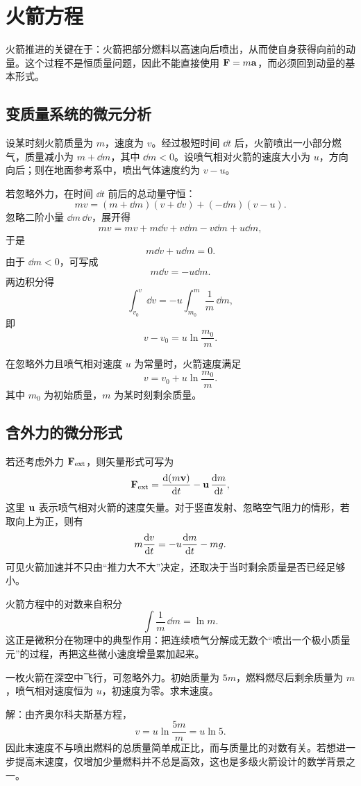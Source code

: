 \section{火箭方程}

火箭推进的关键在于：火箭把部分燃料以高速向后喷出，从而使自身获得向前的动量。这个过程不是恒质量问题，因此不能直接使用 $\vb F=m\vb a$，而必须回到动量的基本形式。

\subsection{变质量系统的微元分析}

设某时刻火箭质量为 $m$，速度为 $v$。经过极短时间 $\dd t$ 后，火箭喷出一小部分燃气，质量减小为 $m+\dd m$，其中 $\dd m<0$。设喷气相对火箭的速度大小为 $u$，方向向后；则在地面参考系中，喷出气体速度约为 $v-u$。

若忽略外力，在时间 $\dd t$ 前后的总动量守恒：
\[
mv=(m+\dd m)(v+\dd v)+(-\dd m)(v-u).
\]
忽略二阶小量 $\dd m\,\dd v$，展开得
\[
mv=mv+m\dd v+v\dd m- v\dd m+u\dd m,
\]
于是
\[
m\dd v+u\dd m=0.
\]
由于 $\dd m<0$，可写成
\[
m\dd v=-u\dd m.
\]
两边积分得
\[
\int_{v_0}^{v}\dd v=-u\int_{m_0}^{m}\frac{1}{m}\,\dd m,
\]
即
\[
v-v_0=u\ln\frac{m_0}{m}.
\]

\begin{law}[齐奥尔科夫斯基火箭方程]
在忽略外力且喷气相对速度 $u$ 为常量时，火箭速度满足
\[
v=v_0+u\ln\frac{m_0}{m}.
\]
其中 $m_0$ 为初始质量，$m$ 为某时刻剩余质量。
\end{law}

\subsection{含外力的微分形式}

若还考虑外力 $\vb F_{\text{ext}}$，则矢量形式可写为
\[
\vb F_{\text{ext}}=\dv{(m\vb{v})}{t}-\vb u\,\dv{m}{t},
\]
这里 $\vb u$ 表示喷气相对火箭的速度矢量。对于竖直发射、忽略空气阻力的情形，若取向上为正，则有
\[
m\dv{v}{t}=-u\dv{m}{t}-mg.
\]
可见火箭加速并不只由“推力大不大”决定，还取决于当时剩余质量是否已经足够小。

\begin{remark}
火箭方程中的对数来自积分
\[
\int \frac{1}{m}\,\dd m=\ln m.
\]
这正是微积分在物理中的典型作用：把连续喷气分解成无数个“喷出一个极小质量元”的过程，再把这些微小速度增量累加起来。
\end{remark}

\begin{example}
一枚火箭在深空中飞行，可忽略外力。初始质量为 $5m$，燃料燃尽后剩余质量为 $m$，喷气相对速度恒为 $u$，初速度为零。求末速度。

解：由齐奥尔科夫斯基方程，
\[
v=u\ln\frac{5m}{m}=u\ln 5.
\]
因此末速度不与喷出燃料的总质量简单成正比，而与质量比的对数有关。若想进一步提高末速度，仅增加少量燃料并不总是高效，这也是多级火箭设计的数学背景之一。
\end{example}

